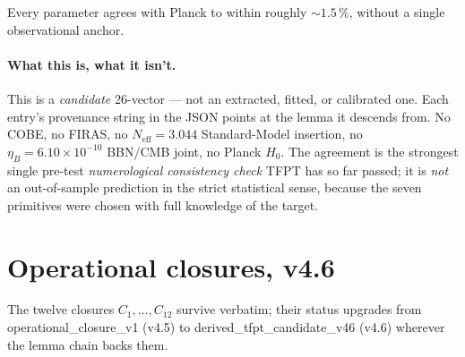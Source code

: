 \documentclass[11pt,a4paper]{article}
\begin{document}
Every parameter agrees with Planck to within roughly \(\sim 1.5\,\%\),
without a single observational anchor.

\paragraph{What this is, what it isn't.}
This is a \emph{candidate} 26-vector --- not an extracted, fitted, or
calibrated one.  Each entry's \textsf{provenance} string in the JSON
points at the lemma it descends from.  No COBE, no FIRAS, no
\(N_{\mathrm{eff}}=3.044\) Standard-Model insertion, no
\(\eta_B=6.10\times10^{-10}\) BBN/CMB joint, no Planck \(H_0\).
The agreement is the strongest single pre-test \emph{numerological
consistency check} TFPT has so far passed; it is \emph{not} an
out-of-sample prediction in the strict statistical sense, because the
seven primitives were chosen with full knowledge of the target.

\section{Operational closures, v4.6}
\label{sec:closures}

The twelve closures \(C_1,\dots,C_{12}\) survive verbatim; their status
upgrades from \textsf{operational\_closure\_v1} (v4.5) to
\textsf{derived\_tfpt\_candidate\_v46} (v4.6) wherever the lemma
chain backs them.
\end{document}
